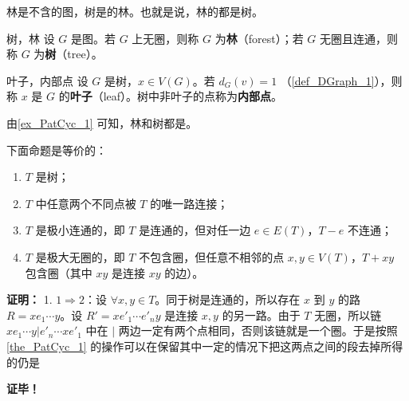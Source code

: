 
林是不含的图，树是的林。也就是说，林的都是树。

\begin{definition}{树，林}
设 $G$ 是图。若 $G$ 上无圈，则称 $G$ 为\textbf{林}（forest）；若 $G$ 无圈且连通，则称 $G$ 为\textbf{树}（tree）。
\end{definition}


\begin{definition}{叶子，内部点}
设 $G$ 是树，$x\in V(G)$。若 $d_G(v)=1$ （\autoref{def_DGraph_1}），则称 $x$ 是 $G$ 的\textbf{叶子}（leaf）。树中非叶子的点称为\textbf{内部点}。
\end{definition}

由\autoref{ex_PatCyc_1} 可知，林和树都是。


\begin{theorem}{}
下面命题是等价的：
\begin{enumerate}
\item $T$ 是树；
\item $T$ 中任意两个不同点被 $T$ 的唯一路连接；
\item $T$ 是极小连通的，即 $T$ 是连通的，但对任一边 $e\in E(T)$，$T-e$ 不连通；
\item $T$ 是极大无圈的，即 $T$ 不包含圈，但任意不相邻的点 $x,y\in V(T)$，$T+xy$ 包含圈（其中 $xy$ 是连接 $xy$ 的边）。
\end{enumerate}

\end{theorem}

\textbf{证明：}
1. $1\Rightarrow 2$：设 $\forall x,y\in T$。同于树是连通的，所以存在 $x$ 到 $y$ 的路 $R=xe_1\cdots y$。设 $R'=xe'_1\cdots e'_n y$ 是连接 $x,y$ 的另一路。由于 $T$ 无圈，所以链 $xe_1\cdots y|e'_n\cdots xe'_1$ 中在 $|$ 两边一定有两个点相同，否则该链就是一个圈。于是按照\autoref{the_PatCyc_1} 的操作可以在保留其中一定的情况下把这两点之间的段去掉所得的仍是




\textbf{证毕！}






















